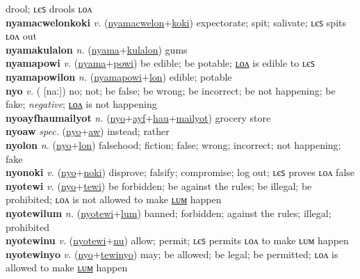 drool; ʟєꜱ drools ʟᴏᴧ \label{nyamacwelonkae} \\
\textbf{nyamacwelonkoki} \textit{v.} (\hyperref[nyamacwelon]{nyamacwelon}+\hyperref[koki]{koki})
expectorate; spit; salivate; ʟєꜱ spits ʟᴏᴧ out \label{nyamacwelonkoki} \\
\textbf{nyamakulalon} \textit{n.} (\hyperref[nyama]{nyama}+\hyperref[kulalon]{kulalon})
gums \label{nyamakulalon} \\
\textbf{nyamapowi} \textit{v.} (\hyperref[nyama]{nyama}+\hyperref[powi]{powi})
be edible; be potable; \hyperref[nyamapowilon]{ʟᴏᴧ} is edible to ʟєꜱ \label{nyamapowi} \\
\textbf{nyamapowilon} \textit{n.} (\hyperref[nyamapowi]{nyamapowi}+\hyperref[lon]{lon})
edible; potable \label{nyamapowilon} \\
\textbf{nyo} \textit{v.} ( [naː])
no; not; be false; be wrong; be incorrect; be not happening; be fake; \textit{negative}; \hyperref[nyolon]{ʟᴏᴧ} is not happening \label{nyo} \\
\textbf{nyoayfhaumailyot} \textit{n.} (\hyperref[nyo]{nyo}+\hyperref[ayf]{ayf}+\hyperref[hau]{hau}+\hyperref[mailyot]{mailyot})
grocery store \label{nyoayfhaumailyot} \\
\textbf{nyoaw} \textit{spec.} (\hyperref[nyo]{nyo}+\hyperref[aw]{aw})
instead; rather \label{nyoaw} \\
\textbf{nyolon} \textit{n.} (\hyperref[nyo]{nyo}+\hyperref[lon]{lon})
falsehood; fiction; false; wrong; incorrect; not happening; fake \label{nyolon} \\
\textbf{nyonoki} \textit{v.} (\hyperref[nyo]{nyo}+\hyperref[noki]{noki})
disprove; falsify; compromise; log out; ʟєꜱ proves ʟᴏᴧ false \label{nyonoki} \\
\textbf{nyotewi} \textit{v.} (\hyperref[nyo]{nyo}+\hyperref[tewi]{tewi})
be forbidden; be against the rules; be illegal; be prohibited; ʟᴏᴧ is not allowed to make \hyperref[nyotewilum]{ʟᴜᴍ} happen \label{nyotewi} \\
\textbf{nyotewilum} \textit{n.} (\hyperref[nyotewi]{nyotewi}+\hyperref[lum]{lum})
banned; forbidden; against the rules; illegal; prohibited \label{nyotewilum} \\
\textbf{nyotewinu} \textit{v.} (\hyperref[nyotewi]{nyotewi}+\hyperref[nu]{nu})
allow; permit; ʟєꜱ permits ʟᴏᴧ to make ʟᴜᴍ happen \label{nyotewinu} \\
\textbf{nyotewinyo} \textit{v.} (\hyperref[nyo]{nyo}+\hyperref[tewinyo]{tewinyo})
may; be allowed; be legal; be permitted; ʟᴏᴧ is allowed to make \hyperref[nyotewinyolum]{ʟᴜᴍ} happen \label{nyotewinyo} \\
